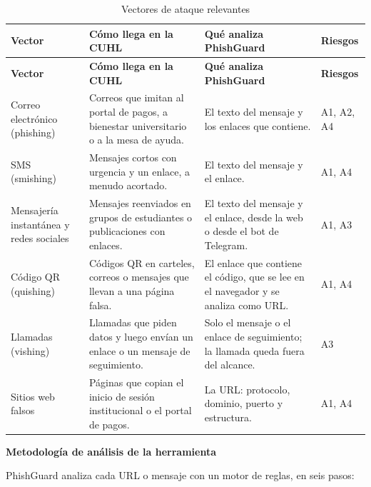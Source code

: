 \documentclass[journal,onecolumn,12pt,draftclsnofoot]{IEEEtran}
\newcommand{\apartado}[1]{\par\medskip\noindent\textbf{#1}\par\smallskip}
\begin{document}
\begingroup
\footnotesize
\setlength{\tabcolsep}{3pt}
\begin{longtable}{|>{\raggedright\arraybackslash}p{}|>{\raggedright\arraybackslash}p{}|>{\raggedright\arraybackslash}p{}|>{\raggedright\arraybackslash}p{}|}
\caption{Vectores de ataque relevantes}\label{tab:vectores}\\
\hline
\textbf{Vector} & \textbf{Cómo llega en la CUHL} & \textbf{Qué analiza PhishGuard} & \textbf{Riesgos} \\ \hline
\endfirsthead
\hline
\textbf{Vector} & \textbf{Cómo llega en la CUHL} & \textbf{Qué analiza PhishGuard} & \textbf{Riesgos} \\ \hline
\endhead
Correo electrónico (phishing) & Correos que imitan al portal de pagos, a bienestar universitario o a la mesa de ayuda. & El texto del mensaje y los enlaces que contiene. & A1, A2, A4 \\ \hline
SMS (smishing) & Mensajes cortos con urgencia y un enlace, a menudo acortado. & El texto del mensaje y el enlace. & A1, A4 \\ \hline
Mensajería instantánea y redes sociales & Mensajes reenviados en grupos de estudiantes o publicaciones con enlaces. & El texto del mensaje y el enlace, desde la web o desde el bot de Telegram. & A1, A3 \\ \hline
Código QR (quishing) & Códigos QR en carteles, correos o mensajes que llevan a una página falsa. & El enlace que contiene el código, que se lee en el navegador y se analiza como URL. & A1, A4 \\ \hline
Llamadas (vishing) & Llamadas que piden datos y luego envían un enlace o un mensaje de seguimiento. & Solo el mensaje o el enlace de seguimiento; la llamada queda fuera del alcance. & A3 \\ \hline
Sitios web falsos & Páginas que copian el inicio de sesión institucional o el portal de pagos. & La URL: protocolo, dominio, puerto y estructura. & A1, A4 \\ \hline
\end{longtable}
\endgroup

\apartado{Metodología de análisis de la herramienta}

PhishGuard analiza cada URL o mensaje con un motor de reglas, en seis pasos:
\end{document}
